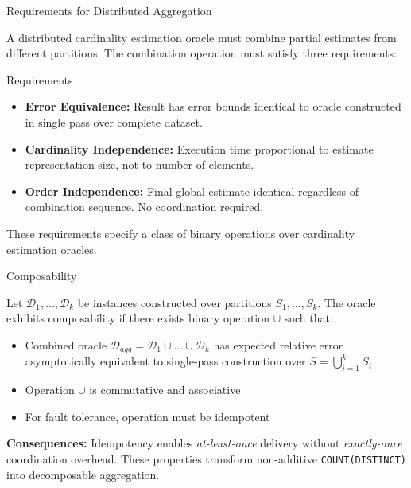 \documentclass{beamer}
\begin{document}
\begin{frame}{Requirements for Distributed Aggregation}

    A distributed cardinality estimation oracle must combine partial estimates from different partitions. The combination operation must satisfy three requirements:

    \begin{block}{Requirements}
        \begin{itemize}
            \item \textbf{Error Equivalence:} Result has error bounds identical to oracle constructed in single pass over complete dataset.
            \item \textbf{Cardinality Independence:} Execution time proportional to estimate representation size, not to number of elements.
            \item \textbf{Order Independence:} Final global estimate identical regardless of combination sequence. No coordination required.
        \end{itemize}
    \end{block}

    These requirements specify a class of binary operations over cardinality estimation oracles.

\end{frame}

\begin{frame}{Composability}

    \begin{definition}[Composability]
        Let $\mathcal{D}_1, \dots, \mathcal{D}_k$ be instances constructed over partitions $S_1, \dots, S_k$. The oracle exhibits composability if there exists binary operation $\cup$ such that:
        \begin{itemize}
            \item Combined oracle $\mathcal{D}_{agg} = \mathcal{D}_1 \cup \dots \cup \mathcal{D}_k$ has expected relative error asymptotically equivalent to single-pass construction over $S = \bigcup_{i=1}^k S_i$
            \item Operation $\cup$ is commutative and associative
            \item For fault tolerance, operation must be idempotent
        \end{itemize}
    \end{definition}

    \vspace{1em}

    \textbf{Consequences:}
    Idempotency enables \emph{at-least-once} delivery without \emph{exactly-once} coordination overhead. These properties transform non-additive \texttt{COUNT(DISTINCT)} into decomposable aggregation.

\end{frame}
\end{document}
